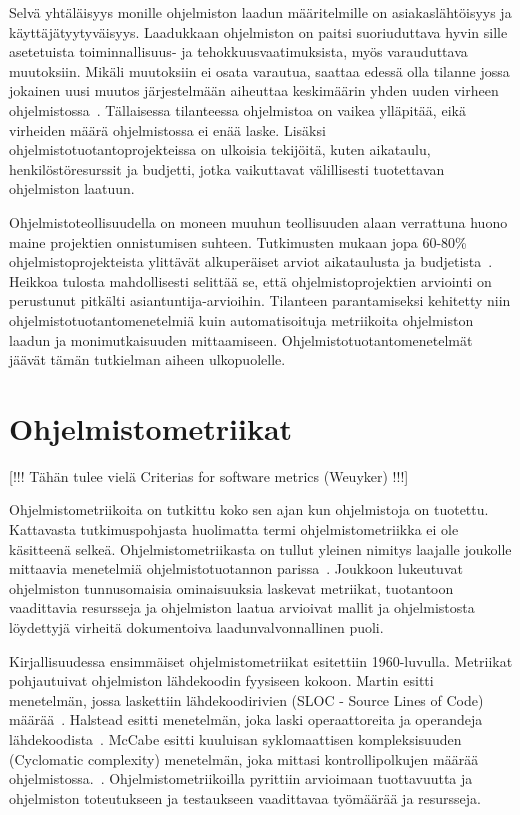 \documentclass[finnish]{tktltiki2}
\theoremstyle{definition}
\theoremstyle{remark}
\begin{document}
Selvä yhtäläisyys monille ohjelmiston laadun määritelmille on asiakaslähtöisyys ja käyttäjätyytyväisyys. Laadukkaan ohjelmiston on paitsi suoriuduttava hyvin sille asetetuista toiminnallisuus- ja tehokkuusvaatimuksista, myös varauduttava muutoksiin. Mikäli muutoksiin ei osata varautua, saattaa edessä olla tilanne jossa jokainen uusi muutos järjestelmään aiheuttaa keskimäärin yhden uuden virheen ohjelmistossa~\cite{LB85}. Tällaisessa tilanteessa ohjelmistoa on vaikea ylläpitää, eikä virheiden määrä ohjelmistossa ei enää laske. Lisäksi ohjelmistotuotantoprojekteissa on ulkoisia tekijöitä, kuten aikataulu, henkilöstöresurssit ja budjetti, jotka vaikuttavat välillisesti tuotettavan ohjelmiston laatuun.

Ohjelmistoteollisuudella on moneen muuhun teollisuuden alaan verrattuna huono maine projektien onnistumisen suhteen. Tutkimusten mukaan jopa 60-80\% ohjelmistoprojekteista ylittävät alkuperäiset arviot aikataulusta ja budjetista~\cite{MJ03}. Heikkoa tulosta mahdollisesti selittää se, että ohjelmistoprojektien arviointi on perustunut pitkälti asiantuntija-arvioihin. Tilanteen parantamiseksi kehitetty niin ohjelmistotuotantomenetelmiä kuin automatisoituja metriikoita ohjelmiston laadun ja monimutkaisuuden mittaamiseen. Ohjelmistotuotantomenetelmät jäävät tämän tutkielman aiheen ulkopuolelle.

\section{Ohjelmistometriikat}

[!!! Tähän tulee vielä Criterias for software metrics (Weuyker) !!!]\newline

Ohjelmistometriikoita on tutkittu koko sen ajan kun ohjelmistoja on tuotettu. Kattavasta tutkimuspohjasta huolimatta termi ohjelmistometriikka ei ole käsitteenä selkeä. Ohjelmistometriikasta on tullut yleinen nimitys laajalle joukolle mittaavia menetelmiä ohjelmistotuotannon parissa~\cite{FM00}. Joukkoon lukeutuvat ohjelmiston tunnusomaisia ominaisuuksia laskevat metriikat, tuotantoon vaadittavia resursseja ja ohjelmiston laatua arvioivat mallit ja ohjelmistosta löydettyjä virheitä dokumentoiva laadunvalvonnallinen puoli.

Kirjallisuudessa ensimmäiset ohjelmistometriikat esitettiin 1960-luvulla. Metriikat pohjautuivat ohjelmiston lähdekoodin fyysiseen kokoon. Martin esitti menetelmän, jossa laskettiin lähdekoodirivien (SLOC - Source Lines of Code) määrää~\cite{M65}.  Halstead esitti menetelmän, joka laski operaattoreita ja operandeja lähdekoodista~\cite{H72, H77}. McCabe esitti kuuluisan syklomaattisen kompleksisuuden (Cyclomatic complexity) menetelmän, joka mittasi kontrollipolkujen määrää ohjelmistossa.~\cite{M76}. Ohjelmistometriikoilla pyrittiin arvioimaan tuottavuutta ja ohjelmiston toteutukseen ja testaukseen vaadittavaa työmäärää ja resursseja.
\end{document}

